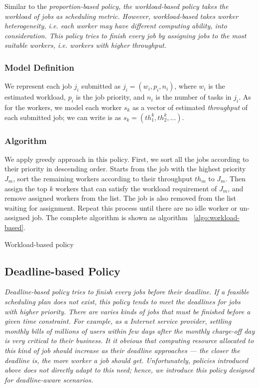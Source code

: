 
Similar to the \em{proportion-based} policy, the \em{workload-based}
policy takes the workload of jobs as scheduling metric.
However, \em{workload-based} takes worker heterogeneity, i.e. each
worker may have different computing ability, into consideration.
This policy tries to finish every job by assigning jobs to the most 
suitable workers, i.e. workers with higher throughput.

\subsubsection{Model Definition}

We represent each job $j_i$ submitted as $j_i = (w_i, p_i, n_i)$, where
$w_i$ is the estimated workload, $p_i$ is the job priority, and $n_i$
is the number of tasks in $j_i$.
As for the workers, we model each worker $s_k$ as a vector of estimated
\emph{throughput} of each submitted job; we can write is as $s_k =
(th^k_1, th^k_2, \ldots)$.

\subsubsection{Algorithm}

We apply greedy approach in this policy.
First, we sort all the jobs according to their priority in descending
order.
Starts from the job with the highest priority $J_m$, sort the remaining
workers according to their throughput $th_m$ to $J_m$.
Then assign the top $k$ workers that can satisfy the workload
requirement of $J_m$, and remove assigned workers from the list.
The job is also removed from the list waiting for assignment.
Repeat this process until there are no idle worker or un-assigned job.
The complete algorithm is shown as algorithm ~\ref{algo:workload-based}.

\begin{algorithm}[htbp]

\caption{Workload-based policy}
\label{algo:workload-based}
\end{algorithm}


\subsection{Deadline-based Policy}	%

\em{Deadline-based} policy tries to finish every jobs before their 
deadline.
If a feasible scheduling plan does not exist, this policy tends to meet
the deadlines for jobs with higher priority.
There are varies kinds of jobs that must be finished before a given 
time constraint.
For example, as a Internet service provider, settling monthly bills of
millions of users within few days after the monthly charge-off day is
very critical to their business.
It it obvious that computing resource allocated to this kind of job 
should increase as their deadline approaches --- the closer the 
deadline is, the more worker a job should get.
Unfortunately, policies introduced above does not directly adapt to 
this need; hence, we introduce this policy designed for
\emph{deadline-aware} scenarios.

